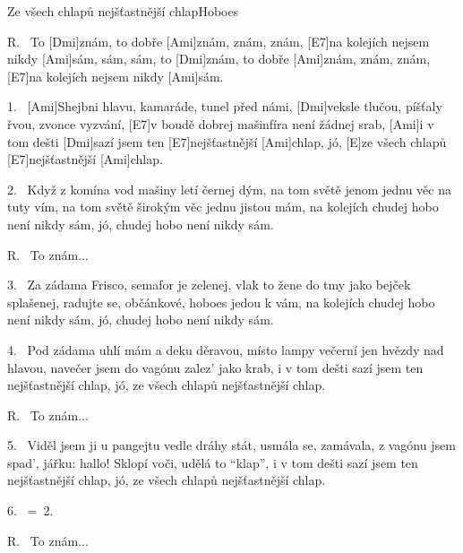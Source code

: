 \begin{song}{Ze všech chlapů nejšťastnější chlap}{Hoboes}

\begin{xverse}{R.~}
To [\large Dmi]znám, to dobře [\large Ami]znám, znám, znám,
[\large E7]na kolejích nejsem nikdy [\large Ami]sám, sám, sám,
to [\large Dmi]znám, to dobře [\large Ami]znám, znám, znám,
[\large E7]na kolejích nejsem nikdy [\large Ami]sám.
\end{xverse}

\begin{xverse}{1.~}
[\large Ami]Shejbni hlavu, kamaráde, tunel před námi,
[\large Dmi]veksle tlučou, píšťaly řvou, zvonce vyzvání,
[\large E7]v boudě dobrej mašinfíra není žádnej srab,
[\large Ami]i v tom dešti [\large Dmi]sazí jsem ten [\large E7]nejšťastnější [\large Ami]chlap,
jó, [\large E]ze všech chlapů [\large E7]nejšťastnější [\large Ami]chlap.
\end{xverse}

\begin{xverse}{2.~}
Když z komína vod mašiny letí černej dým,
na tom světě jenom jednu věc na tuty vím,
na tom světě širokým věc jednu jistou mám,
na kolejích chudej hobo není nikdy sám,
jó, chudej hobo není nikdy sám.
\end{xverse}

\begin{xverse}{R.~}
To znám...
\end{xverse}


\begin{xverse}{3.~}
Za zádama Frisco, semafor je zelenej,
vlak to žene do tmy jako bejček splašenej,
radujte se, občánkové, hoboes jedou k vám,
na kolejích chudej hobo není nikdy sám,
jó, chudej hobo není nikdy sám.
\end{xverse}

\begin{xverse}{4.~}
Pod zádama uhlí mám a deku děravou,
místo lampy večerní jen hvězdy nad hlavou,
navečer jsem do vagónu zalez' jako krab,
i v tom dešti sazí jsem ten nejšťastnější chlap,
jó, ze všech chlapů nejšťastnější chlap.
\end{xverse}

\begin{xverse}{R.~}
To znám...
\end{xverse}

\begin{xverse}{5.~}
Viděl jsem ji u pangejtu vedle dráhy stát,
usmála se, zamávala, z vagónu jsem spad',
jářku: hallo! Sklopí voči, udělá to ``klap'',
i v tom dešti sazí jsem ten nejšťastnější chlap,
jó, ze všech chlapů nejšťastnější chlap.
\end{xverse}

\begin{xverse}{6.~}
=\ 2.
\end{xverse}

\begin{xverse}{R.~}
To znám...
\end{xverse}

\end{song}